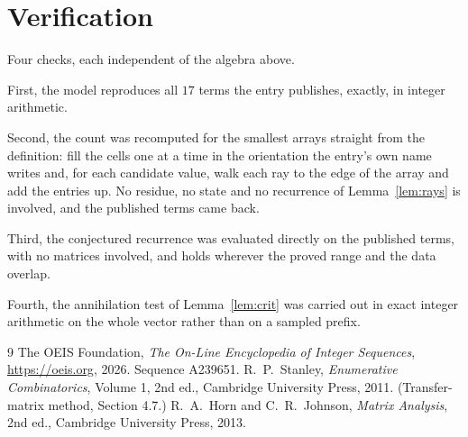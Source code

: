 \documentclass[11pt,a4paper]{article}
\theoremstyle{plain}
\theoremstyle{definition}
\begin{document}
\section{Verification}

Four checks, each independent of the algebra above.

First, the model reproduces all $17$ terms the entry publishes, exactly, in integer
arithmetic.

Second, the count was recomputed for the smallest arrays straight from the definition: fill the
cells one at a time in the orientation the entry's own name writes and, for each candidate
value, walk each ray to the edge of the array and add the entries up. No residue, no state and
no recurrence of Lemma~\ref{lem:rays} is involved, and the published terms came back.

Third, the conjectured recurrence was evaluated directly on the published terms, with no
matrices involved, and holds wherever the proved range and the data overlap.

Fourth, the annihilation test of Lemma~\ref{lem:crit} was carried out in exact integer
arithmetic on the whole vector rather than on a sampled prefix.

\begin{thebibliography}{9}
 The OEIS Foundation, \emph{The On-Line Encyclopedia of Integer
Sequences}, \url{https://oeis.org}, 2026. Sequence A239651.
 R.~P.~Stanley, \emph{Enumerative Combinatorics}, Volume 1, 2nd ed.,
Cambridge University Press, 2011. (Transfer-matrix method, Section 4.7.)
 R.~A.~Horn and C.~R.~Johnson, \emph{Matrix Analysis}, 2nd ed., Cambridge
University Press, 2013.
\end{thebibliography}
\end{document}
